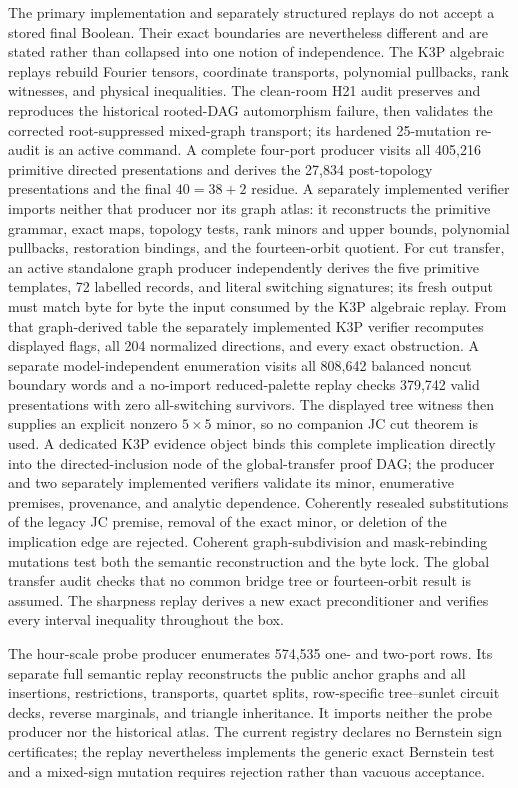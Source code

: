 The primary implementation and separately structured replays do not accept a
stored final Boolean.  Their exact boundaries are nevertheless different and
are stated rather than collapsed into one notion of independence.  The K3P
algebraic replays rebuild Fourier tensors, coordinate transports, polynomial
pullbacks, rank witnesses, and physical inequalities.  The clean-room H21
audit preserves and reproduces the historical rooted-DAG automorphism failure,
then validates the corrected root-suppressed mixed-graph transport; its
hardened 25-mutation re-audit is an active command.  A complete four-port
producer visits all 405,216 primitive directed presentations and derives the
27,834 post-topology presentations and the final \(40=38+2\) residue.  A
separately implemented verifier imports neither that producer nor its graph
atlas: it reconstructs the primitive grammar, exact maps, topology tests,
rank minors and upper bounds, polynomial pullbacks, restoration bindings, and
the fourteen-orbit quotient.  For cut transfer, an
active standalone graph producer independently derives the five primitive
templates, 72 labelled records, and literal switching signatures; its fresh
output must match byte for byte the input consumed by the K3P algebraic replay.
From that graph-derived table the separately implemented K3P verifier
recomputes displayed flags, all 204 normalized directions, and every exact
obstruction.  A separate model-independent enumeration visits all 808,642
balanced noncut boundary words and a no-import reduced-palette replay checks
379,742 valid presentations with zero all-switching survivors.  The displayed
tree witness then supplies an explicit nonzero \(5\times5\) minor, so no companion JC
cut theorem is used.  A dedicated K3P evidence object binds this complete
implication directly into the directed-inclusion node of the global-transfer
proof DAG; the producer and two separately implemented verifiers validate its
minor, enumerative premises, provenance, and analytic dependence.  Coherently
resealed substitutions of the legacy JC premise, removal of the exact minor,
or deletion of the implication edge are rejected.  Coherent graph-subdivision
and mask-rebinding mutations
test both the semantic reconstruction and the byte lock.  The global transfer audit checks that no
common bridge tree or fourteen-orbit result is assumed.  The sharpness replay
derives a new exact preconditioner and verifies every interval inequality
throughout the box.

The hour-scale probe producer enumerates 574,535 one- and two-port rows.  Its
separate full semantic replay reconstructs the public anchor graphs and all
insertions, restrictions, transports, quartet splits, row-specific
tree--sunlet circuit decks, reverse marginals, and triangle inheritance.  It
imports neither the probe producer nor the historical atlas.  The current
registry declares no Bernstein sign certificates; the replay nevertheless
implements the generic exact Bernstein test and a mixed-sign mutation requires
rejection rather than vacuous acceptance.


